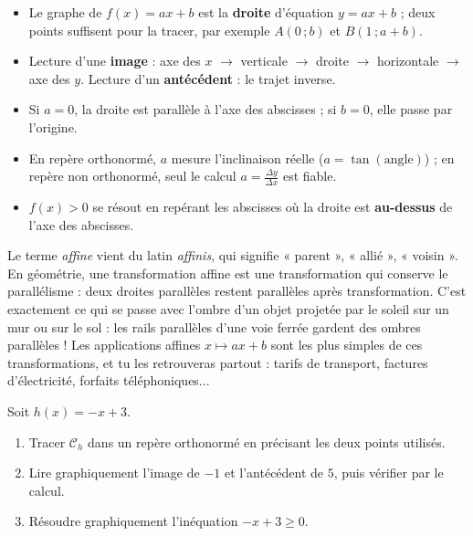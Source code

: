 \documentclass[11pt]{article}
\begin{document}
\begin{aretenir}
\begin{itemize}
\item Le graphe de $f(x)=ax+b$ est la \textbf{droite} d'équation $y=ax+b$ ; deux points suffisent pour la tracer, par exemple $A(0\,;b)$ et $B(1\,;a+b)$.
\item Lecture d'une \textbf{image} : axe des $x$ $\to$ verticale $\to$ droite $\to$ horizontale $\to$ axe des $y$. Lecture d'un \textbf{antécédent} : le trajet inverse.
\item Si $a=0$, la droite est parallèle à l'axe des abscisses ; si $b=0$, elle passe par l'origine.
\item En repère orthonormé, $a$ mesure l'inclinaison réelle ($a=\tan(\text{angle})$) ; en repère non orthonormé, seul le calcul $a=\frac{\Delta y}{\Delta x}$ est fiable.
\item $f(x)>0$ se résout en repérant les abscisses où la droite est \textbf{au-dessus} de l'axe des abscisses.
\end{itemize}
\end{aretenir}

\begin{savaistu}
Le terme \emph{affine} vient du latin \emph{affinis}, qui signifie « parent », « allié », « voisin ». En géométrie, une transformation affine est une transformation qui conserve le parallélisme : deux droites parallèles restent parallèles après transformation. C'est exactement ce qui se passe avec l'ombre d'un objet projetée par le soleil sur un mur ou sur le sol : les rails parallèles d'une voie ferrée gardent des ombres parallèles ! Les applications affines $x\mapsto ax+b$ sont les plus simples de ces transformations, et tu les retrouveras partout : tarifs de transport, factures d'électricité, forfaits téléphoniques...
\end{savaistu}

\begin{exercice}
Soit $h(x)=-x+3$.
\begin{enumerate}
\item Tracer $\mathcal{C}_h$ dans un repère orthonormé en précisant les deux points utilisés.
\item Lire graphiquement l'image de $-1$ et l'antécédent de $5$, puis vérifier par le calcul.
\item Résoudre graphiquement l'inéquation $-x+3\geqslant 0$.
\end{enumerate}
\end{exercice}
\end{document}
